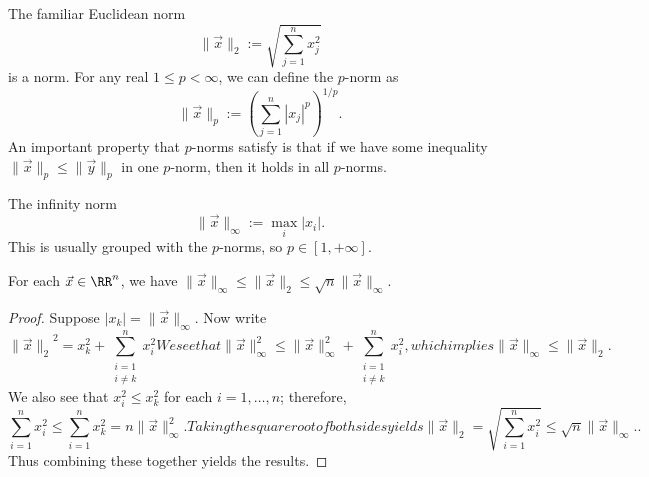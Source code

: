 \begin{example}
The familiar Euclidean norm 
\begin{equation}
\|\vec{x}\|_{2}:=\sqrt{\sum^{n}_{j=1}x_{j}^{2}}
\end{equation}
is a norm. For any real $1\leq p<\infty$, we can define the $p$-norm as
\begin{equation}
\|\vec{x}\|_{p}:=\left(\sum^{n}_{j=1}|x_{j}|^{p}\right)^{1/p}.
\end{equation}
An important property that $p$-norms satisfy is that if we have some
inequality $\|\vec{x}\|_{p}\leq\|\vec{y}\|_{p}$ in one $p$-norm, then it
holds in all $p$-norms. 
\end{example}

\begin{example}
The infinity norm
\begin{equation}
\|\vec{x}\|_{\infty} := \max_{i}|x_{i}|.
\end{equation}
This is usually grouped with the $p$-norms, so $p\in[1,+\infty]$.  
\end{example}


\begin{theorem}
For each $\vec{x}\in\RR^{n}$, we have
$\|\vec{x}\|_{\infty}\leq\|\vec{x}\|_{2}\leq\sqrt{n}\|\vec{x}\|_{\infty}$.
\end{theorem}

\begin{proof}
  Suppose $|x_{k}|=\|\vec{x}\|_{\infty}$. Now write
  \begin{subequations}
  \begin{equation}
{\|\vec{x}\|_{2}}^{2}=x_{k}^{2}+\sum^{n}_{\substack{i=1\\i\neq k}}x_{i}^{2}
  \end{equation}
  We see that
  \begin{equation}
\|\vec{x}\|_{\infty}^{2}\leq\|\vec{x}\|_{\infty}^{2}+\sum^{n}_{\substack{i=1\\i\neq k}}x_{i}^{2},
  \end{equation}
  which implies
  \begin{equation}
\|\vec{x}\|_{\infty}\leq\|\vec{x}\|_{2}.
  \end{equation}
  \end{subequations}
  We also see that $x_{i}^{2}\leq x_{k}^{2}$ for each $i=1,\dots,n$; therefore,
  \begin{subequations}
    \begin{equation}
\sum^{n}_{i=1}x_{i}^{2}\leq\sum^{n}_{i=1}x_{k}^{2}=n\|\vec{x}\|_{\infty}^{2}.
    \end{equation}
Taking the squareroot of both sides yields
    \begin{equation}
\|\vec{x}\|_{2}=\sqrt{\sum^{n}_{i=1}x_{i}^{2}}\leq\sqrt{n}\|\vec{x}\|_{\infty}..
    \end{equation}
  \end{subequations}
  Thus combining these together yields the results.
\end{proof}

